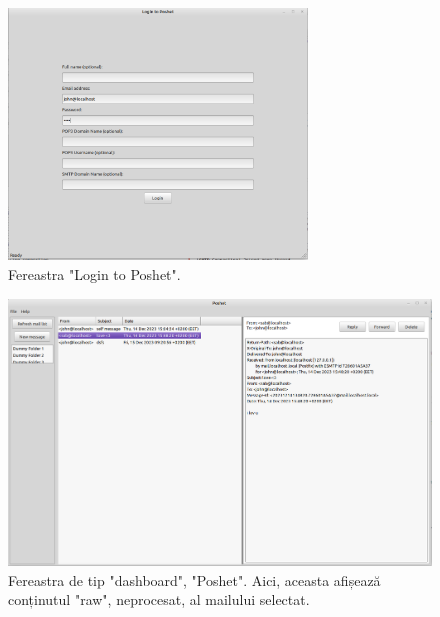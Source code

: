\documentclass[runningheads]{llncs}
\begin{document}
\begin{figure}
    \centering
    \includegraphics[width={300px}]{poshetLogin.png}
    \caption{Fereastra "Login to Poshet".}
    \label{fig:poshetlogin}
\end{figure}

\begin{figure}
    \centering
    \includegraphics[width=\textwidth]{poshetDashboard.png}
    \caption{Fereastra de tip "dashboard", "Poshet". Aici, aceasta afișează conținutul "raw", neprocesat, al mailului selectat.}
    \label{fig:poshetlogin}
\end{figure}

\newpage
\end{document}
